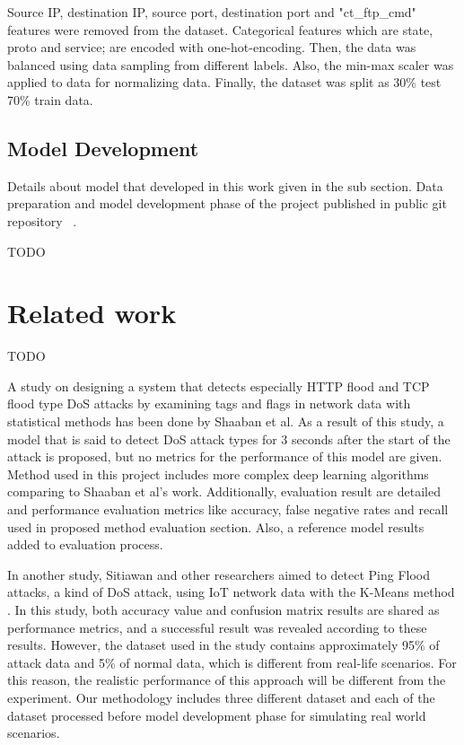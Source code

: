 \documentclass{article}
\begin{document}
Source IP, destination IP, source port, destination port and "ct\_ftp\_cmd" features were removed from the dataset. Categorical features which are state, proto and service; are encoded with one-hot-encoding. Then, the data was balanced using data sampling from different labels. Also, the min-max scaler was applied to data for normalizing data. Finally, the dataset was split as 30\% test 70\% train data.

\subsection{Model Development}
Details about model that developed in this work given in the sub section. Data preparation and model development phase of the project published in public git repository ~\cite{ozgunk}.

TODO

\section{Related work}
TODO


A study on designing a system that detects especially HTTP flood and TCP flood type DoS attacks by examining tags and flags in network data with statistical methods has been done by Shaaban et al\cite{Shaaban}. As a result of this study, a model that is said to detect DoS attack types for 3 seconds after the start of the attack is proposed, but no metrics for the performance of this model are given. Method used in this project includes more complex deep learning algorithms comparing to Shaaban et al's work. Additionally, evaluation result are detailed and performance evaluation metrics like accuracy, false negative rates and recall used in proposed method evaluation section. Also, a reference model results added to evaluation process.

In another study, Sitiawan and other researchers aimed to detect Ping Flood attacks, a kind of DoS attack, using IoT network data with the K-Means method \cite{Stiawan}. 
In this study, both accuracy value and confusion matrix results are shared as performance metrics, and a successful result was revealed according to these results. However, the dataset used in the study contains approximately 95\% of attack data and 5\% of normal data, which is different from real-life scenarios. For this reason, the realistic performance of this approach will be different from the experiment. Our methodology includes three different dataset and each of the dataset processed before model development phase for simulating real world scenarios.
\end{document}
